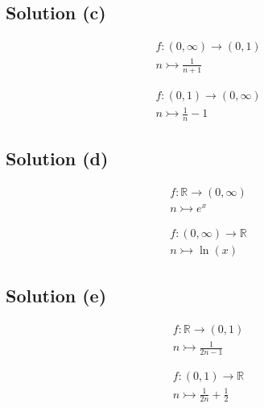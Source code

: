 \documentclass[12pt]{report}
\begin{document}
\subsection{Solution (c)}
\begin{multicols}{2}
    \begin{gather}
        f : (0,\infty) \to (0,1)\\
        n \rightarrowtail \frac{1}{n + 1}
    \end{gather}

    \columnbreak
    \begin{gather}
        f : (0,1) \to (0,\infty)\\
        n \rightarrowtail \frac{1}{n} - 1
    \end{gather}
    
\end{multicols}

\subsection{Solution (d)}
\begin{multicols}{2}
    \begin{gather}
        f : \mathbb{R} \to (0, \infty)\\
        n \rightarrowtail e^x
    \end{gather}

    \columnbreak
    \begin{gather}
        f : (0, \infty) \to \mathbb{R}\\
        n \rightarrowtail \ln(x)
    \end{gather}
\end{multicols}

\subsection{Solution (e)}
\begin{multicols}{2}
    \begin{gather}
        f : \mathbb{R} \to (0, 1)\\
        n \rightarrowtail \frac{1}{2n - 1}
    \end{gather}

    \columnbreak
    \begin{gather}
        f : (0, 1) \to \mathbb{R}\\
        n \rightarrowtail \frac{1}{2n} + \frac{1}{2}
    \end{gather}
\end{multicols}
\end{document}
